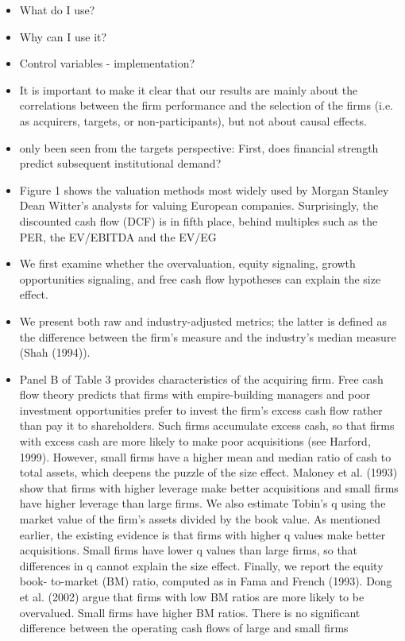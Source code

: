 \documentclass[12pt]{article}
\begin{document}
    \begin{itemize}
            \item What do I use? 
            \item Why can I use it?
            \item Control variables - implementation?

            \item It is important to make it clear that our results are mainly about the correlations between the firm performance and the selection of the firms (i.e. as acquirers, targets, or non-participants), but not about causal effects. \citep{Liu2013}

            \item only been seen from the targets perspective: First, does financial strength predict subsequent institutional demand? \citep{Choi2012}

            \item Figure 1 shows the valuation methods most widely used by Morgan Stanley Dean Witter’s analysts for valuing European companies. Surprisingly, the discounted cash flow (DCF) is in fifth place, behind multiples such as the PER, the EV/EBITDA and the EV/EG \citep{Fernandez2001}

            \item We first examine whether the overvaluation, equity signaling, growth opportunities signaling, and free cash flow hypotheses can explain the size effect. \citep{Moeller2004}

            \item We present both raw and industry-adjusted metrics; the latter is defined as the difference between the firm’s measure and the industry’s median measure (Shah (1994)). \citep{Klein2009}

            \item Panel B of Table 3 provides characteristics of the acquiring firm. Free cash flow theory predicts that firms with empire-building managers and poor investment opportunities prefer to invest the firm’s excess cash flow rather than pay it to shareholders. Such firms accumulate excess cash, so that firms with excess cash are more likely to make poor acquisitions (see Harford, 1999). However, small firms have a higher mean and median ratio of cash to total assets, which deepens the puzzle of the size effect. Maloney et al. (1993) show that firms with higher leverage make better acquisitions and small firms have higher leverage than large firms. We also estimate Tobin’s q using the market value of the firm’s assets divided by the book value. As mentioned earlier, the existing evidence is that firms with higher q values make better acquisitions. Small firms have lower q values than large firms, so that differences in q cannot explain the size effect. Finally, we report the equity book- to-market (BM) ratio, computed as in Fama and French (1993). Dong et al. (2002) argue that firms with low BM ratios are more likely to be overvalued. Small firms have higher BM ratios. There is no significant difference between the operating cash flows of large and small firms \citep{Moeller2004}


\end{itemize}
\end{document}
